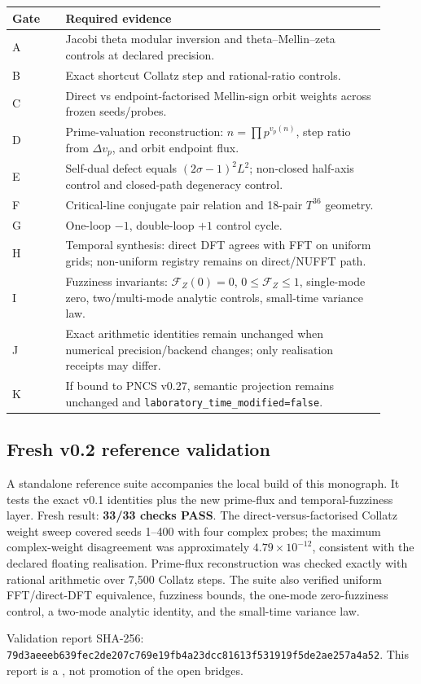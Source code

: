 \begin{longtable}{p{0.13\linewidth}p{0.78\linewidth}}
\toprule
Gate & Required evidence\\
\midrule
A & Jacobi theta modular inversion and theta--Mellin--zeta controls at declared precision.\\
B & Exact shortcut Collatz step and rational-ratio controls.\\
C & Direct vs endpoint-factorised Mellin-sign orbit weights across frozen seeds/probes.\\
D & Prime-valuation reconstruction: \(n=\prod p^{v_p(n)}\), step ratio from \(\Delta v_p\), and orbit endpoint flux.\\
E & Self-dual defect equals \((2\sigma-1)^2L^2\); non-closed half-axis control and closed-path degeneracy control.\\
F & Critical-line conjugate pair relation and 18-pair \(T^{36}\) geometry.\\
G & One-loop \(-1\), double-loop \(+1\) control cycle.\\
H & Temporal synthesis: direct DFT agrees with FFT on uniform grids; non-uniform registry remains on direct/NUFFT path.\\
I & Fuzziness invariants: \(\mathcal F_Z(0)=0\), \(0\le\mathcal F_Z\le1\), single-mode zero, two/multi-mode analytic controls, small-time variance law.\\
J & Exact arithmetic identities remain unchanged when numerical precision/backend changes; only realisation receipts may differ.\\
K & If bound to PNCS v0.27, semantic projection remains unchanged and \texttt{laboratory\_time\_modified=false}.\\
\bottomrule
\end{longtable}

\subsection{Fresh v0.2 reference validation}

A standalone reference suite accompanies the local build of this monograph. It tests the exact v0.1 identities plus the new prime-flux and temporal-fuzziness layer. Fresh result: \textbf{33/33 checks PASS}. The direct-versus-factorised Collatz weight sweep covered seeds 1--400 with four complex probes; the maximum complex-weight disagreement was approximately \(4.79\times10^{-12}\), consistent with the declared floating realisation. Prime-flux reconstruction was checked exactly with rational arithmetic over 7,500 Collatz steps. The suite also verified uniform FFT/direct-DFT equivalence, fuzziness bounds, the one-mode zero-fuzziness control, a two-mode analytic identity, and the small-time variance law.\par
\medskip
Validation report SHA-256: \texttt{79d3aeeeb639fec2de207c769e19fb4a23dcc81613f531919f5de2ae257a4a52}. This report is a , not promotion of the open bridges.

